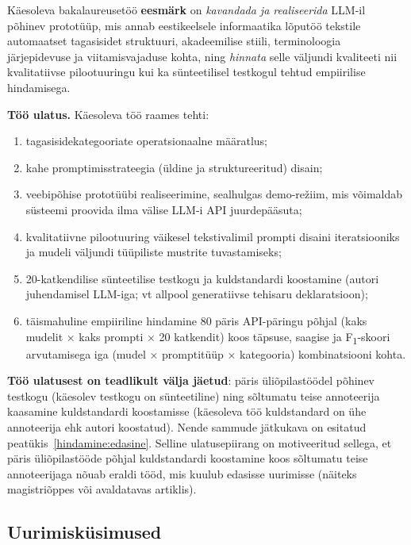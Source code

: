 Käesoleva bakalaureusetöö \textbf{eesmärk} on \emph{kavandada ja realiseerida} LLM-il põhinev prototüüp, mis annab eestikeelsele informaatika lõputöö tekstile automaatset tagasisidet struktuuri, akadeemilise stiili, terminoloogia järjepidevuse ja viitamisvajaduse kohta, ning \emph{hinnata} selle väljundi kvaliteeti nii kvalitatiivse pilootuuringu kui ka sünteetilisel testkogul tehtud empiirilise hindamisega.

\textbf{Töö ulatus.} Käesoleva töö raames tehti:
\begin{enumerate}
    \item tagasisidekategooriate operatsionaalne määratlus;
    \item kahe promptimisstrateegia (üldine ja struktureeritud) disain;
    \item veebipõhise prototüübi realiseerimine, sealhulgas demo-režiim, mis võimaldab süsteemi proovida ilma välise LLM-i API juurdepääsuta;
    \item kvalitatiivne pilootuuring väikesel tekstivalimil prompti disaini iteratsiooniks ja mudeli väljundi tüüpiliste mustrite tuvastamiseks;
    \item 20-katkendilise sünteetilise testkogu ja kuldstandardi koostamine (autori juhendamisel LLM-iga; vt allpool generatiivse tehisaru deklaratsioon);
    \item täismahuline empiiriline hindamine 80 päris API-päringu põhjal (kaks mudelit × kaks prompti × 20 katkendit) koos täpsuse, saagise ja F\textsubscript{1}-skoori arvutamisega iga (mudel × promptitüüp × kategooria) kombinatsiooni kohta.
\end{enumerate}

\textbf{Töö ulatusest on teadlikult välja jäetud}: päris üliõpilastöödel põhinev testkogu (käesolev testkogu on sünteetiline) ning sõltumatu teise annoteerija kaasamine kuldstandardi koostamisse (käesoleva töö kuldstandard on ühe annoteerija ehk autori koostatud). Nende sammude jätkukava on esitatud peatükis~\ref{hindamine:edasine}. Selline ulatusepiirang on motiveeritud sellega, et päris üliõpilastööde põhjal kuldstandardi koostamine koos sõltumatu teise annoteerijaga nõuab eraldi tööd, mis kuulub edasisse uurimisse (näiteks magistriõppes või avaldatavas artiklis).

\subsection*{Uurimisküsimused}

